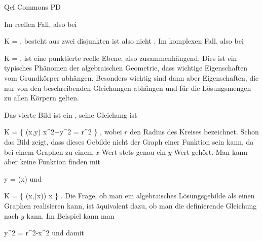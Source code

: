 { {} {Qef} {Commons} {PD} {}


Im reellen Fall, also bei

\mavergleichskette
{\vergleichskette
{ K
}
{ = }{ \R
}
{  }{
}
{    }{
}
{   }{
}
}
{}{}{,}
besteht
\mathl{\R^\times}{}
 {} {}
aus zwei disjunkten  ist also nicht  {.} Im komplexen Fall, also bei

\mavergleichskette
{\vergleichskette
{ K
}
{ = }{ \Complex
}
{  }{
}
{    }{
}
{   }{
}
}
{}{}{,}
ist
\mathl{\Complex^\times}{}
 {} {}
eine punktierte reelle Ebene, also zusammenhängend. Dies ist ein typisches Phänomen der algebraischen Geometrie, dass wichtige Eigenschaften vom Grundkörper abhängen. Besonders wichtig sind dann aber Eigenschaften, die nur von den beschreibenden Gleichungen abhängen und für die Lösungsmengen zu allen Körpern gelten.


}
Das vierte Bild ist ein  {,} seine Gleichung ist

\mavergleichskette
{\vergleichskette
{ K
}
{ = }{ \left\{ (x,y)  \mid   x^2+y^2 = r^2        \right\}
}
{  }{
}
{    }{
}
{   }{
}
}
{}{}{,}
wobei $r$ den Radius des Kreises bezeichnet. Schon das Bild zeigt, dass dieses Gebilde nicht der Graph einer Funktion
 {} {}
sein kann, da bei einem Graphen zu einem $x$-Wert stets genau ein $y$-Wert gehört. Man kann aber keine Funktion finden mit

\mavergleichskette
{\vergleichskette
{ y
}
{ = }{ \varphi(x)
}
{  }{
}
{    }{
}
{   }{
}
}
{}{}{}
und

\mavergleichskette
{\vergleichskette
{K
}
{ = }{ \left\{  (x,\varphi(x))  \mid   x \in \R         \right\}
}
{  }{
}
{    }{
}
{   }{
}
}
{}{}{.}
Die Frage, ob man ein algebraisches Lösungsgebilde als einen Graphen realisieren kann, ist äquivalent dazu, ob man die definierende Gleichung nach $y$  kann. Im Beispiel kann man

\mavergleichskette
{\vergleichskette
{ y^2
}
{ = }{r^2-x^2
}
{  }{
}
{    }{
}
{   }{
}
}
{}{}{}
und damit

